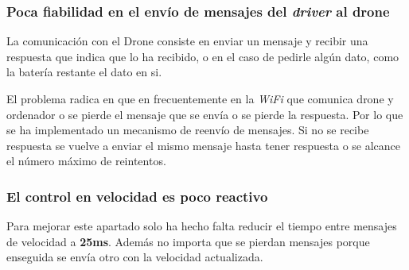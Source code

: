 \subsubsection*{Poca fiabilidad en el envío de mensajes del \textit{driver} al drone}
La comunicación con el Drone consiste en enviar un mensaje y recibir una respuesta que indica que lo ha recibido, o en el caso de pedirle algún dato, como la batería restante el dato en si.

El problema radica en que en frecuentemente en la \textit{WiFi} que comunica drone y ordenador o se pierde el mensaje que se envía o  se pierde la respuesta. Por lo que se ha implementado un mecanismo de reenvío de mensajes. Si no se recibe respuesta se vuelve a enviar el mismo mensaje hasta tener respuesta o se alcance el número máximo de reintentos.

\subsubsection*{El control en velocidad es poco reactivo}
 Para mejorar este apartado solo ha hecho falta reducir el tiempo entre mensajes de velocidad a \textbf{25ms}. Además no importa que se pierdan mensajes porque enseguida se envía otro con la velocidad actualizada.

